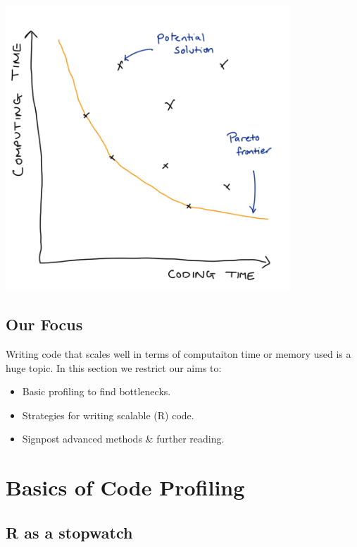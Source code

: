 \documentclass[
  letterpaper,
  DIV=11,
  numbers=noendperiod]{scrreprt}
\providecommand{\tightlist}{%
  \setlength{\itemsep}{0pt}\setlength{\parskip}{0pt}}\usepackage{longtable,booktabs,array}
\begin{document}
\begin{center}
\includegraphics[width=0.8\textwidth,height=\textheight]{images/403-production-scalability/pareto-frontier.png}
\end{center}

\subsection{Our Focus}\label{our-focus}

Writing code that scales well in terms of computaiton time or memory
used is a huge topic. In this section we restrict our aims to:

\begin{itemize}
\tightlist
\item
  Basic profiling to find bottlenecks.
\item
  Strategies for writing scalable (R) code.
\item
  Signpost advanced methods \& further reading.
\end{itemize}

\section{Basics of Code Profiling}\label{basics-of-code-profiling}

\subsection{R as a stopwatch}\label{r-as-a-stopwatch}
\end{document}
